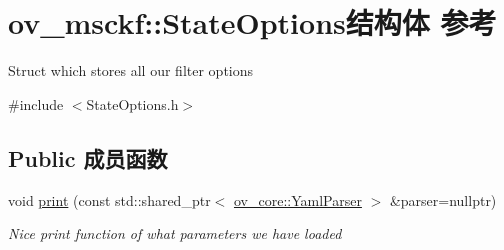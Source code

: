 \hypertarget{structov__msckf_1_1StateOptions}{}\section{ov\+\_\+msckf\+:\+:State\+Options结构体 参考}
\label{structov__msckf_1_1StateOptions}


Struct which stores all our filter options  




{\ttfamily \#include $<$State\+Options.\+h$>$}

\subsection*{Public 成员函数}
\begin{DoxyCompactItemize}
\item 
\mbox{\label{structov__msckf_1_1StateOptions_a053913ab9567ff179ec6ed6dbaef46a8}} 
void \hyperlink{structov__msckf_1_1StateOptions_a053913ab9567ff179ec6ed6dbaef46a8}{print} (const std\+::shared\+\_\+ptr$<$ \hyperlink{classov__core_1_1YamlParser}{ov\+\_\+core\+::\+Yaml\+Parser} $>$ \&parser=nullptr)
\begin{DoxyCompactList}\small\item\em Nice print function of what parameters we have loaded \end{DoxyCompactList}\end{DoxyCompactItemize}
